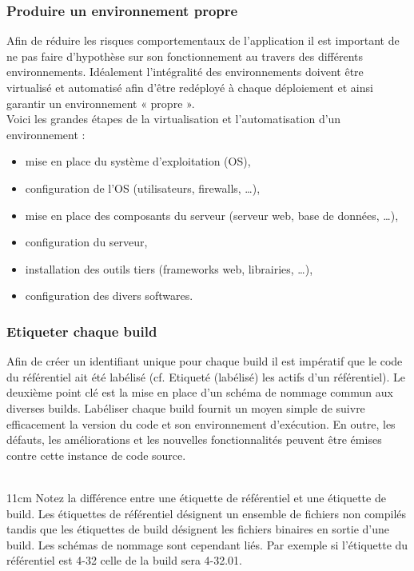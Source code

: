       \subsubsection{Produire un environnement propre}
      Afin de réduire les risques comportementaux de l’application il est important de ne pas faire d’hypothèse sur son fonctionnement au travers des différents environnements. Idéalement l’intégralité des environnements doivent être virtualisé et automatisé afin d’être redéployé à chaque déploiement et ainsi garantir un environnement « propre ».\\
      Voici les grandes étapes de la virtualisation et l’automatisation d’un environnement :\\
      \begin{itemize}
        \item mise en place du système d’exploitation (OS),
        \item configuration de l’OS (utilisateurs, firewalls, …),
        \item mise en place des composants du serveur (serveur web, base de données, …),
        \item configuration du serveur,
        \item installation des outils tiers (frameworks web, librairies, …),
        \item	configuration des divers softwares.\\
      \end{itemize}

      \subsubsection{Etiqueter chaque build}
      Afin de créer un identifiant unique pour chaque build il est impératif que le code du référentiel ait été labélisé (cf. Etiqueté (labélisé) les actifs d’un référentiel). Le deuxième point clé est la mise en place d’un schéma de nommage commun aux diverses builds. Labéliser chaque build fournit un moyen simple de suivre efficacement la version du code et son environnement d’exécution. En outre, les défauts, les améliorations et les nouvelles fonctionnalités peuvent être émises contre cette instance de code source.\\\\

      \begin {boxedminipage} {11cm}
        Notez la différence entre une étiquette de référentiel et une étiquette de build. Les étiquettes de référentiel désignent un ensemble de fichiers non compilés tandis que les étiquettes de build désignent les fichiers binaires en sortie d’une build. Les schémas de nommage sont cependant liés. Par exemple si l’étiquette du référentiel est 4-32 celle de la build sera 4-32.01.
      \end {boxedminipage}\\

